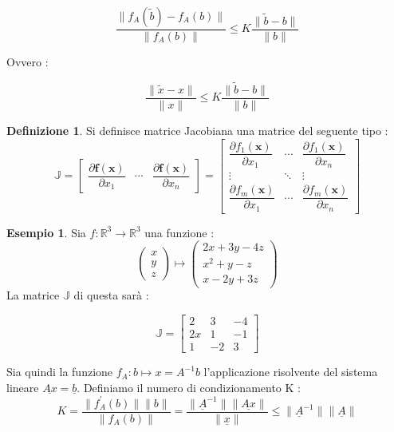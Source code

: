 \documentclass[12pt, a4paper]{book}
\theoremstyle{definition}
\newtheorem{exmp}{Esempio}[section]
\newtheorem{defn}{Definizione}[section]
\newcommand{\VarMtrx}[1]{\ensuremath{\underline{#1}}}
\begin{document}
\begin{flushleft}
\[ 
	\frac{ \lVert f_{A}(\tilde{b}) - f_{A}(b)\rVert }{ \lVert  f_{A}(b) \rVert} \leq K  \frac{ \lVert \tilde{b} - b \rVert }{ \lVert  b \rVert}
\]

Ovvero : 

\[ 
	\frac{ \lVert \tilde{x} - x \rVert }{ \lVert x \rVert} \leq K  \frac{ \lVert \tilde{b} - b \rVert }{ \lVert  b \rVert}
\]


\begin{defn}
Si definisce matrice Jacobiana una matrice del seguente tipo : 
\[
	\mathbb{J}=\left[\begin{array}{ccc}
	\dfrac{\partial \mathbf{f}(\mathbf{x})}{\partial x_{1}} & \cdots & \dfrac{\partial \mathbf{f}(\mathbf{x})}{\partial x_{n}}
	\end{array}\right]=\left[\begin{array}{ccc}
	\dfrac{\partial f_{1}(\mathbf{x})}{\partial x_{1}} & \cdots & \dfrac{\partial f_{1}(\mathbf{x})}{\partial x_{n}} \\
	\vdots & \ddots & \vdots \\
	\dfrac{\partial f_{m}(\mathbf{x})}{\partial x_{1}} & \cdots & \dfrac{\partial f_{m}(\mathbf{x})}{\partial x_{n}}
	\end{array}\right]
\]
\end{defn}
\begin{exmp}
Sia $f: \mathbb{R}^{3} \rightarrow \mathbb{R}^{3}$ una funzione :
\[ 
	\begin{pmatrix} x \\ y \\ z  \end{pmatrix} \mapsto \begin{pmatrix} 2x + 3y - 4z \\ x^{2} + y -z \\ x - 2y + 3z  \end{pmatrix} 
\]
La matrice $\mathbb{J}$ di questa sarà : 

\[ 
	\mathbb{J} = 
			\begin{bmatrix}
				2 & 3 & -4 \\
				2x & 1 & -1 \\
				1 & -2 & 3
			\end{bmatrix}
\]
\end{exmp}
Sia quindi la funzione $f_{A} : b \mapsto x = A^{-1}b$ l'applicazione risolvente del sistema lineare $\VarMtrx{Ax} = \VarMtrx{b}$. Definiamo il numero di condizionamento K : 
\[ 
	K = \frac{\lVert f^{'}_{A}(b)\rVert \lVert b\rVert}{\lVert f_{A}(b)\rVert} 
	   = \frac{\lVert \VarMtrx{A}^{-1} \rVert \lVert \VarMtrx{Ax} \rVert}{\lVert \VarMtrx{x} \rVert} 
	   \leq \lVert \VarMtrx{A}^{-1} \rVert \lVert \VarMtrx{A} \rVert 
\]


\end{flushleft}
\end{document}

